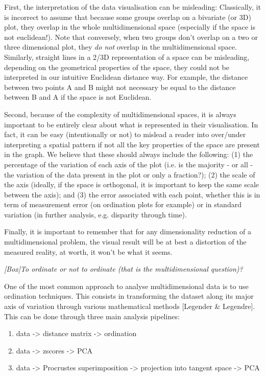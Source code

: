 \documentclass[12pt,letterpaper]{article}
\renewcommand{\subsection}[1]{%
\bigskip
\begin{center}
\begin{large}
\normalfont\itshape #1
\end{large}
\end{center}}
\begin{document}
First, the interpretation of the data visualisation can be misleading:
Classically, it is incorrect to assume that because some groups overlap on a bivariate (or 3D) plot, they overlap in the whole multidimensional space (especially if the space is not euclidean!).
Note that conversely, when two groups don't overlap on a two or three dimensional plot, they \textit{do not} overlap in the multidimensional space.
Similarly, straight lines in a 2/3D representation of a space can be misleading, depending on the geometrical properties of the space, they could not be interpreted in our intuitive Euclidean distance way.
For example, the distance between two points A and B might not necessary be equal to the distance between B and A if the space is not Euclidean.

Second, because of the complexity of multidimensional spaces, it is always important to be entirely clear about what is represented in their visualisation.
In fact, it can be easy (intentionally or not) to mislead a reader into over/under interpreting a spatial pattern if not all the key properties of the space are present in the graph.
We believe that these should always include the following:
(1) the percentage of the variation of each axis of the plot (i.e. is the majority - or all - the variation of the data present in the plot or only a fraction?);
(2) the scale of the axis (ideally, if the space is orthogonal, it is important to keep the same scale between the axis);
and (3) the error associated with each point, whether this is in term of measurement error (on ordination plots for example) or in standard variation (in further analysis, e.g. disparity through time).

Finally, it is important to remember that for any dimensionality reduction of a multidimensional problem, the visual result will be at best a distortion of the measured reality, at worth, it won't be what it seems.


\subsection{[Box]To ordinate or not to ordinate (that is the multidimensional question)?}
\label{box_ordination}
One of the most common approach to analyse multidimensional data is to use ordination techniques.
This consists in transforming the dataset along its major axis of variation through various mathematical methods [Legender \& Legendre].
This can be done through three main analysis pipelines:
\begin{enumerate}
    \item data -> distance matrix -> ordination
    \item data -> zscores -> PCA
    \item data -> Procrustes superimposition -> projection into tangent space -> PCA
\end{enumerate}
\end{document}
